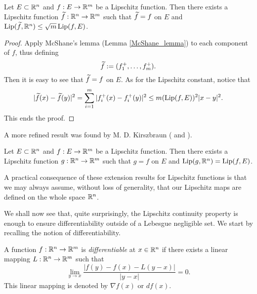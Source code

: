 \begin{corollary}
Let $E \subset \mathbb{R}^{n}$ and $f: E \to \mathbb{R}^{m}$ be a Lipschitz function. Then there exists a Lipschitz function $\widetilde{ f} : \mathbb{R}^{n} \to \mathbb{R}^{m}$ such that $\widetilde{ f} = f$ on $E$ and $\operatorname{Lip}(\widetilde{ f}, \mathbb{R}^{n}) \le \sqrt{m} \operatorname{Lip}(f, E)$.
\end{corollary}
\begin{proof}
Apply McShane's lemma (Lemma \ref{McShane_lemma}) to each component of $f$, thus defining
\begin{equation*}
\widetilde{ f} := (f_{1}^{+}, \dots, f_{m}^{+}).
\end{equation*}
Then it is easy to see that $\widetilde{ f}= f$ on $E$. As for the Lipschitz constant, notice that
\begin{equation*}
|\widetilde{ f}(x) - \widetilde{ f}(y)|^{2} = \sum_{i = 1}^{m}|f_{i}^{+}(x) - f_{i}^{+}(y)|^{2} \le m (\operatorname{Lip}(f, E))^{2} |x - y|^2.
\end{equation*}
This ends the proof.
\end{proof}

A more refined result was found by M. D. Kirszbraun (\cite[2.10.43]{Fe} and \cite[Theorem I.7.2]{maggi2012sets}).

\begin{theorem}
Let $E \subset \mathbb{R}^{n}$ and $f: E \to \mathbb{R}^{m}$ be a Lipschitz function. Then there exists a Lipschitz function $g: \mathbb{R}^{n} \to \mathbb{R}^{m}$ such that $g = f$ on $E$ and $\operatorname{Lip}(g, \mathbb{R}^{n}) = \operatorname{Lip}(f, E)$.
\end{theorem}

A practical consequence of these extension results for Lipschitz functions is that we may always assume, without loss of generality, that our Lipschitz maps are defined on the whole space $\mathbb{R}^{n}$.

We shall now see that, quite surprisingly, the Lipschitz continuity property is enough to ensure differentiability outside of a Lebesgue negligible set. We start by recalling the notion of differentiability.

\begin{definition}
A function $f : \mathbb{R}^{n} \to \mathbb{R}^{m}$ is {\em differentiable} at $x \in \mathbb{R}^{n}$ if there exists a linear mapping $L: \mathbb{R}^{n} \to \mathbb{R}^{m}$ such that
\begin{equation*}
\lim_{y \to x} \frac{|f(y) - f(x) - L(y - x)|}{|y - x|} = 0.
\end{equation*}
This linear mapping is denoted by $\nabla f(x)$ or $d f(x)$.
\end{definition}

